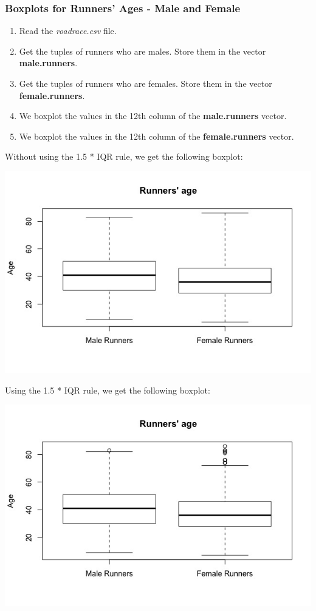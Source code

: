 \documentclass[12pt,letterpaper,titlepage,en-US]{article}
\begin{document}
\subsubsection{Boxplots for Runners' Ages - Male and Female}
\begin{enumerate}
\item Read the \emph{roadrace.csv} file.
\item Get the tuples of runners who are males. Store them in the vector \textbf{male.runners}.
\item Get the tuples of runners who are females. Store them in the vector \textbf{female.runners}.
\item We boxplot the values in the 12th column of the \textbf{male.runners} vector.
\item We boxplot the values in the 12th column of the \textbf{female.runners} vector.
\end{enumerate}
Without using the 1.5 * IQR rule, we get the following boxplot:
\begin{center}
\includegraphics[scale=0.6]{1d2.jpeg}
\end{center}


Using the 1.5 * IQR rule, we get the following boxplot:
\begin{center}
\includegraphics[scale=0.6]{1d.jpeg}
\end{center}
\end{document}
